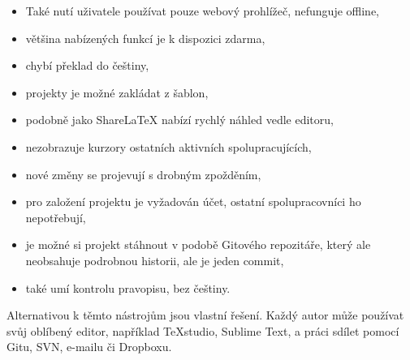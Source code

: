\begin{itemize}
	\item Také nutí uživatele používat pouze webový prohlížeč, nefunguje offline,
	\item většina nabízených funkcí je k dispozici zdarma,
	\item chybí překlad do češtiny,
	\item projekty je možné zakládat z šablon,
	\item podobně jako ShareLaTeX nabízí rychlý náhled vedle editoru,
	\item nezobrazuje kurzory ostatních aktivních spolupracujících,
	\item nové změny se projevují s drobným zpožděním,
	\item pro založení projektu je vyžadován účet, ostatní spolupracovníci ho nepotřebují,
	\item je možné si projekt stáhnout v podobě Gitového repozitáře, který ale neobsahuje podrobnou historii, ale je jeden commit,
	\item také umí kontrolu pravopisu, bez češtiny.
\end{itemize}


Alternativou k těmto nástrojům jsou vlastní řešení. Každý autor může používat svůj oblíbený editor, například TeXstudio, Sublime Text, a práci sdílet pomocí Gitu, SVN, e-mailu či Dropboxu.